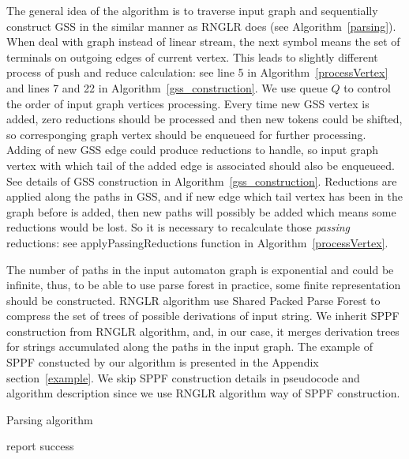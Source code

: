 The general idea of the algorithm is to traverse input graph and sequentially construct GSS
in the similar manner as RNGLR does (see Algorithm~\ref{parsing}). When deal with graph instead of linear stream,
the next symbol means the set of terminals on outgoing edges of current vertex.
This leads to slightly different process of push and reduce calculation: 
see line 5 in Algorithm~\ref{processVertex} and lines 7 and 22 in Algorithm~\ref{gss_construction}. 
We use queue $Q$ to control the order of input graph vertices processing. 
Every time new GSS vertex is added, zero reductions should be processed 
and then new tokens could be shifted, so corresponging graph vertex should be 
enqueueed for further processing. Adding of new GSS edge could produce reductions 
to handle, so input graph vertex with which tail of the added edge is associated should 
also be enqueueed. See details of GSS construction in Algorithm~\ref{gss_construction}. 
Reductions are applied along the paths in GSS, and if new edge 
which tail vertex has been in the graph before is added, then new paths will possibly 
be added which means some reductions would be lost. So it is necessary to recalculate 
those \emph{passing} reductions: see applyPassingReductions function in Algorithm~\ref{processVertex}.

The number of paths in the input automaton graph is exponential and could be infinite,
thus, to be able to use parse forest in practice, some finite representation should 
be constructed. RNGLR algorithm use Shared Packed Parse Forest to compress the set 
of trees of possible derivations of input string. We inherit SPPF construction from 
RNGLR algorithm, and, in our case, it merges derivation trees for strings accumulated 
along the paths in the input graph. The example of SPPF constucted by our algorithm is
presented in the Appendix section~\ref{example}. We skip SPPF construction details in 
pseudocode and algorithm description since we use RNGLR algorithm way of SPPF construction.
\begin{algorithm}[!ht]
\begin{algorithmic}[1]
\caption{Parsing algorithm}
\label{parsing}
\EndFunction

     {report success}
    \EndIf
  \Else
    \EndWhile
    \EndIf
  \EndIf
\EndFunction
\end{algorithmic}
\end{algorithm}

